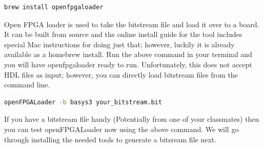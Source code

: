 

\begin{lstlisting}[language=bash]
brew install openfpgaloader
\end{lstlisting}

Open FPGA loader is used to take the bitstream file and load it over to a board. 
It can be built from source and the online install guide for the tool includes special Mac instructions for doing just that; however, 
luckily it is already available as a homebrew install. 
Run the above command in your terminal and you will have openfpgaloader ready to run. 
Unfortunately, this does not accept HDL files as input; however, you can directly load bitstream files from the command line.

\begin{lstlisting}[language=bash]
 openFPGALoader -b basys3 your_bitstream.bit
\end{lstlisting}

If you have a bitstream file handy (Potentially from one of your classmates) then you can test openFPGALoader now using the above command.
We will go through installing the needed tools to generate a bitsream file next.